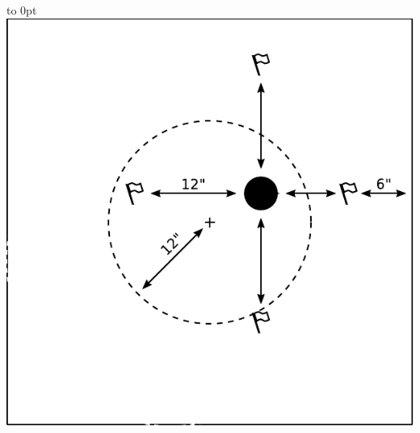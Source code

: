 \begin{tablesetup}
\begin{minipage}[t]{\linewidth-(2.5in+1em)}
  \end{minipage}\hfill
  \begin{minipage}[t]{2.5in}\vbox to 0pt{}
  \includegraphics[width=\linewidth]{missions/comms-placement}
  \end{minipage}

\end{tablesetup}


